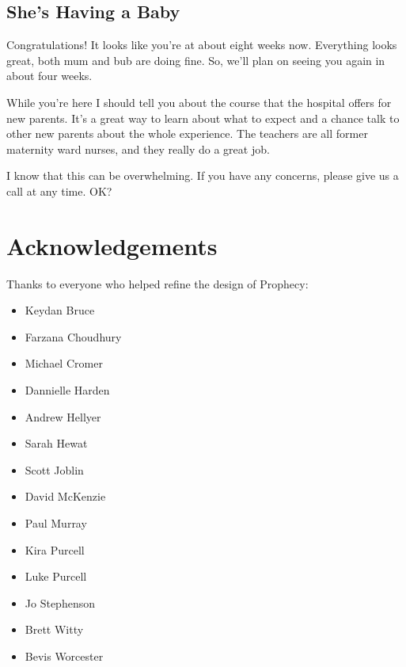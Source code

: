 \documentclass[12pt, a5paper, parskip=half-]{scrartcl}
\begin{document}
\subsection*{She's Having a Baby}
Congratulations! It looks like you're at about eight weeks now.
Everything looks great, both mum and bub are doing fine. 
So, we'll plan on seeing you again in about four weeks.

While you're here I should tell you about the course that the hospital offers for new parents.
It's a great way to learn about what to expect and a chance talk to other new parents about the whole experience. 
The teachers are all former maternity ward nurses, and they really do a great job.

I know that this can be overwhelming.
If you have any concerns, please give us a call at any time. 
OK?

\newpage

\section*{Acknowledgements}
Thanks to everyone who helped refine the design of Prophecy:
\begin{multicols}{2}
\begin{itemize}
  \item Keydan Bruce
  \item Farzana Choudhury
  \item Michael Cromer
  \item Dannielle Harden
  \item Andrew Hellyer
  \item Sarah Hewat
  \item Scott Joblin
  \item David McKenzie
  \item Paul Murray
  \item Kira Purcell
  \item Luke Purcell
  \item Jo Stephenson
  \item Brett Witty
  \item Bevis Worcester
  
\end{itemize}
\end{multicols}
\end{document}
